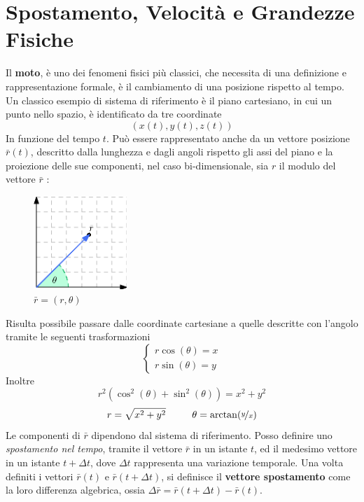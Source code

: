\documentclass[10pt, letterpaper]{report}
\begin{document}
\section{Spostamento, Velocità e Grandezze Fisiche}
Il \textbf{moto}, è uno dei fenomeni fisici più classici, che necessita 
di una definizione e rappresentazione formale, è il cambiamento 
di una posizione rispetto al tempo.\acc 
Un classico esempio di sistema di riferimento è il piano cartesiano, 
in cui un punto nello spazio, è identificato da tre coordinate 
$$ (x(t),y(t),z(t))$$
In funzione del tempo $t$. Può essere rappresentato anche da 
un vettore posizione $\bar r(t)$, descritto dalla lunghezza 
e dagli angoli rispetto gli assi del piano e la proiezione 
delle sue componenti, nel caso bi-dimensionale, sia $r$ il modulo 
del vettore $\bar r$ :
\begin{figure}[h!]
    \centering
    \includegraphics[width=100pt]{images/vecAngolo.eps}
    \caption{ $\bar r = (r,\theta)$}
    \label{fig:vecAng}
\end{figure}\acc 
Risulta possibile passare dalle coordinate cartesiane a quelle descritte 
con l'angolo tramite le seguenti trasformazioni 
$$\begin{cases}
    r\cos(\theta)=x\\ r\sin(\theta)=y
\end{cases} $$
Inoltre 
$$r^2(\cos^2(\theta)+\sin^2(\theta))=x^2+y^2$$
$$r=\sqrt{x^2+y^2}\ \ \ \ \ \ \ \ \theta = \arctan(\nicefrac{y}{x})$$
Le componenti di $\bar r$ dipendono dal sistema di riferimento.
Posso definire uno \textit{spostamento nel tempo}, tramite il vettore 
$\bar r$ in un istante $t$, ed il medesimo vettore in un istante 
$t+\Delta t$, dove $\Delta t$ rappresenta una variazione temporale. 
Una volta definiti i vettori $\bar r (t)$ e $\bar r (t+\Delta t)$,
 si definisce il \textbf{vettore spostamento} come la loro 
 differenza algebrica, ossia $\Delta \bar r = \bar r (t+\Delta t)-\bar r (t)$.
\end{document}
